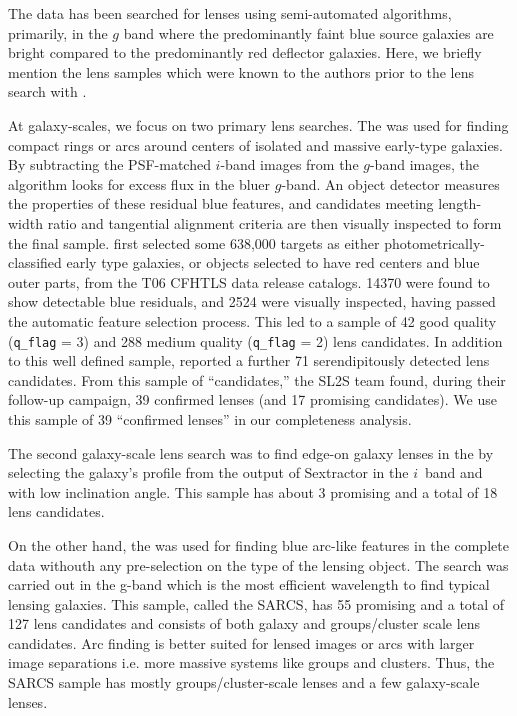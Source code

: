 \documentclass[useAMS,usenatbib,a4paper]{mn2e}
\begin{document}
The \cfhtls data has been searched for lenses using semi-automated algorithms,
primarily, in the $g$ band where the predominantly  faint blue  source
galaxies are bright compared to the predominantly red deflector galaxies.
Here, we briefly mention the lens samples which were known to the authors
prior to the lens search with \sw.

At galaxy-scales, we focus on two primary lens searches. The \rf
\citep{Gavazzi2014} was used for finding compact rings or arcs around centers
of isolated and massive early-type galaxies. By subtracting the PSF-matched
$i$-band images from the $g$-band images, the algorithm looks for excess flux
in the bluer $g$-band. An object detector measures the properties of these
residual blue features, and candidates meeting length-width ratio and
tangential alignment criteria are then visually inspected to form the final
sample. \citet{Gavazzi2014} first selected some 638,000 targets as either
photometrically-classified early type galaxies, or objects selected to have
red centers and blue outer parts, from the T06 CFHTLS data release catalogs. 
14370 were found to show detectable blue residuals, and 2524 were visually
inspected, having passed the automatic feature selection process. This led to
a sample of 42 good quality (\texttt{q\_flag} = 3) and 288 medium quality
(\texttt{q\_flag} = 2) lens candidates. In addition to this well defined
sample, \citet{Gavazzi2014} reported a further 71 serendipitously detected
lens candidates.  From this sample of ``\rf candidates,'' the SL2S team
found, during their follow-up campaign, 39 confirmed lenses (and 17 promising
candidates). We use this sample of 39 ``confirmed \rf lenses'' in our
completeness analysis.

The second galaxy-scale lens search was to find edge-on galaxy lenses in
the \cfhtls \citep{Sygnet2010} by selecting the galaxy's profile from the
output of {\sc Sextractor} in the $i$~band and with low inclination
angle. This sample has about 3 promising and a total of 18 lens
candidates.
 
On the other hand, the \af \citet{More2012} was used for
finding blue arc-like features in the complete \cfhtls data withouth any
pre-selection on the type of the lensing object. The search was carried
out in the g-band which is the most efficient wavelength to find typical
lensing galaxies. This sample, called the SARCS, has 55 promising and a
total of 127 lens candidates and consists of both galaxy and
groups/cluster scale lens candidates. Arc finding is better suited for
lensed images or arcs with larger image separations i.e. more massive
systems like groups and clusters. Thus, the SARCS sample has mostly
groups/cluster-scale lenses and a few galaxy-scale lenses.
\end{document}
